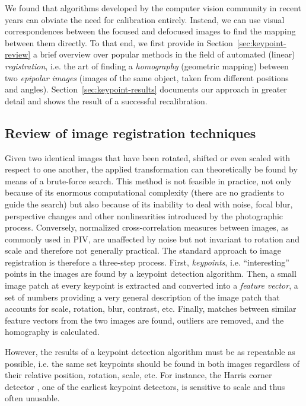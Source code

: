 \documentclass[11.5pt]{book}
\newcommand*{\secref}[1]{Section~\ref{#1}}
\begin{document}
We found that algorithms developed by the computer
vision community in recent years can obviate the need for calibration entirely.
Instead, we can use visual correspondences between the focused and defocused
images to find the mapping between them directly. To that end, we first provide
in \secref{sec:keypoint-review} a brief overview over popular methods in the field of automated (linear)
\emph{registration}, i.e. the art of finding a \emph{homography} (geometric
mapping) between two \emph{epipolar images} (images of the same object, taken
from different positions and angles). \secref{sec:keypoint-results} documents 
our approach in greater detail and shows the result of a successful
recalibration.

\subsection{Review of image registration techniques \label{sec:keypoint-review}} Given two
identical images that have been rotated, shifted or even scaled with respect to
one another, the applied transformation can theoretically be found by means of a
brute-force search. This method is not feasible in practice, not only because of
its enormous computational complexity (there are no gradients to guide the
search) but also because of its inability to deal with noise, focal blur,
perspective changes and other nonlinearities introduced by the photographic
process. Conversely, normalized cross-correlation measures between images, as
commonly used in PIV, are unaffected by noise but not invariant to rotation and
scale and therefore not generally practical. The standard approach to image
registration is therefore a three-step process. First, \emph{keypoints}, i.e.
``interesting'' points in the images are found by a keypoint detection
algorithm.  Then, a small image patch at every keypoint is extracted and
converted into a \emph{feature vector}, a set of numbers providing a very
general description of the image patch that accounts for scale, rotation, blur,
contrast, etc. Finally, matches between similar feature vectors from the two
images are found, outliers are removed, and the homography is calculated.

However, the results of a keypoint detection algorithm
must be as repeatable as possible, i.e. the same set keypoints should be found
in both images regardless of their relative position, rotation, scale, etc. 
For instance, the Harris corner detector \cite{Harris88}, one of the earliest
keypoint detectors, is sensitive to scale and thus often unusable.
\end{document}
